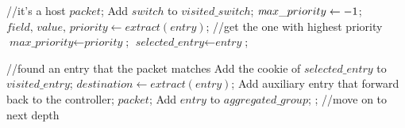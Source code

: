 \begin {tcolorbox}[blanker,float=tbp,
grow to left by=1cm, grow to right by=1cm]
\begin{algorithm}[H]
  \begin{algorithmic}[1]
       //it's a host
        \State \Return $packet$;
      \EndIf
      \State Add $switch$ to $visited\_switch$;
      \State $\textit max\_priority \gets -1$;  
        \State $\textit{field, value, priority} \gets extract(\textit{entry})$;
         //get the one with highest priority 
          \State $\textit{max\_priority} \gets \textit{priority}$;
          \State $\textit{selected\_entry} \gets \textit{entry}$; 
        \EndIf
      \EndFor

       //found an entry that the packet matches
        \State Add the cookie of $selected\_entry$ to $visited\_entry$;
        \State $\textit{destination} \gets extract(\textit{entry})$;
          \State Add auxiliary entry that forward back to the controller;
          \State \Return $packet$;
        \Else
          \State Add $entry$ to $aggregated\_group$;
          \State {}; //move on to next depth
        \EndIf
      \EndIf
  \end{algorithmic}
\end{algorithm}
\end{tcolorbox}

